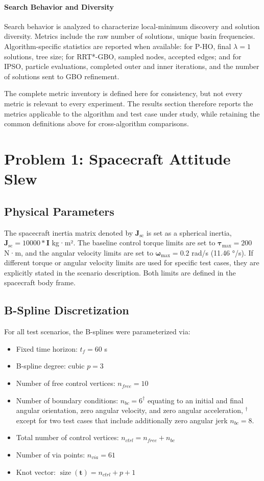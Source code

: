 \paragraph{Search Behavior and Diversity}
Search behavior is analyzed to characterize local-minimum discovery and solution diversity. 
Metrics include the raw number of solutions, unique basin frequencies. 
Algorithm-specific statistics are reported when available: for \ac{P-HO}, final $\lambda=1$ solutions, tree size; for \ac{RRT*-GBO}, sampled nodes, accepted edges; and for \ac{IPSO}, particle evaluations, completed outer and inner iterations, and the number of solutions sent to \ac{GBO} refinement.

The complete metric inventory is defined here for consistency, but not every metric is relevant to every experiment. 
The results section therefore reports the metrics applicable to the algorithm and test case under study, while retaining the common definitions above for cross-algorithm comparisons.

\section{Problem 1: Spacecraft Attitude Slew}
\label{sec:setup_spacecraft}

\subsection{Physical Parameters}
The spacecraft inertia matrix denoted by $\mathbf{J}_{\mathrm{sc}}$ is set as a spherical inertia, $\mathbf{J}_{\mathrm{sc}} = 10000*\mathbf{I}$ kg·m².
The baseline control torque limits are set to $\boldsymbol{\tau}_{\max} = 200$ N·m, and the angular velocity limits are set to $\boldsymbol{\omega}_{\max} = 0.2$ rad/s (11.46 °/s).
If different torque or angular velocity limits are used for specific test cases, they are explicitly stated in the scenario description.
Both limits are defined in the spacecraft body frame.

\subsection{B-Spline Discretization}
For all test scenarios, the B-splines were parameterized via:
\begin{itemize}
    \item Fixed time horizon: $t_f = 60$ s
    \item B-spline degree: cubic $p = 3$
    \item Number of free control vertices: $n_{free} = 10$
    \item Number of boundary conditions: $n_{bc} = 6^\dagger$ equating to an initial and final angular orientation, zero angular velocity, and zero angular acceleration, $^\dagger$ except for two test cases that include additionally zero angular jerk $n_{bc} = 8$.
    \item Total number of control vertices: $n_{ctrl} = n_{free} + n_{bc}$
    \item Number of via points: $n_{via} = 61$
    \item Knot vector: $\operatorname{size}(\mathbf{t}) = n_{ctrl} + p + 1$
\end{itemize}

